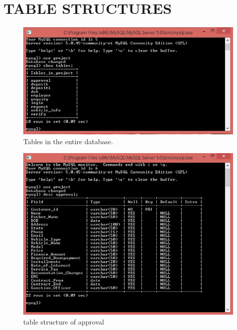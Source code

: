 
\section{TABLE STRUCTURES}


\begin{figure}[ht]
\begin{center}
\includegraphics[scale=0.5]{images/t1.jpg}
\end{center}
\caption{Tables in the entire database.}
\label{Tables in the entire database.}
\end{figure}


\begin{figure}[ht]
\begin{center}
\includegraphics[scale=0.5]{images/t2.jpg}
\end{center}
\caption{table structure of approval}
\label{table structure of approval}
\end{figure}


